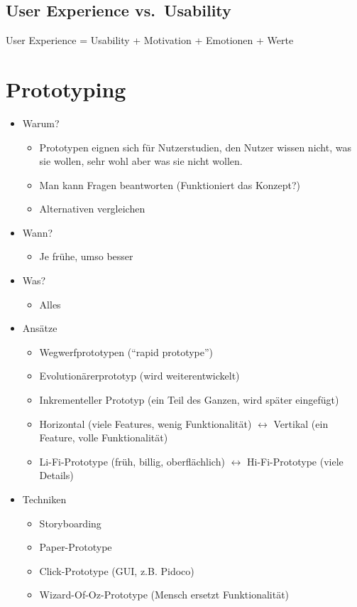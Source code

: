 \subsection{User Experience vs.~Usability}

User Experience = Usability + Motivation + Emotionen + Werte

\section{Prototyping}

\begin{itemize}
\item
  Warum?

  \begin{itemize}
  \item
    Prototypen eignen sich für Nutzerstudien, den Nutzer wissen nicht,
    was sie wollen, sehr wohl aber was sie nicht wollen.
  \item
    Man kann Fragen beantworten (Funktioniert das Konzept?)
  \item
    Alternativen vergleichen
  \end{itemize}
\item
  Wann?

  \begin{itemize}
  \item
    Je frühe, umso besser
  \end{itemize}
\item
  Was?

  \begin{itemize}
  \item
    Alles
  \end{itemize}
\item
  Ansätze

  \begin{itemize}
  \item
    Wegwerfprototypen (``rapid prototype'')
  \item
    Evolutionärerprototyp (wird weiterentwickelt)
  \item
    Inkrementeller Prototyp (ein Teil des Ganzen, wird später eingefügt)
  \item
    Horizontal (viele Features, wenig Funktionalität) $\leftrightarrow$
    Vertikal (ein Feature, volle Funktionalität)
  \item
    Li-Fi-Prototype (früh, billig, oberflächlich) $\leftrightarrow$
    Hi-Fi-Prototype (viele Details)
  \end{itemize}
\item
  Techniken

  \begin{itemize}
  \item
    Storyboarding
  \item
    Paper-Prototype
  \item
    Click-Prototype (GUI, z.B. Pidoco)
  \item
    Wizard-Of-Oz-Prototype (Mensch ersetzt Funktionalität)
  \end{itemize}
\end{itemize}

